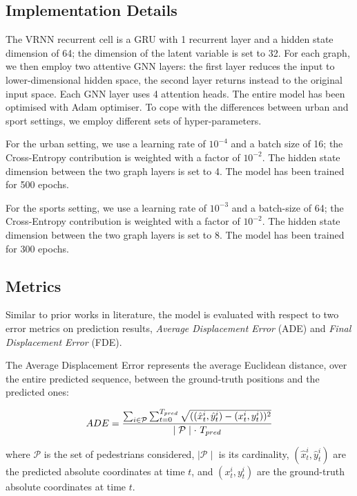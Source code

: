 \documentclass[10pt,a4paper,conference]{IEEEtran}
\begin{document}
\subsection{Implementation Details}
The VRNN recurrent cell is a GRU with 1 recurrent layer and a hidden state dimension of 64; the dimension of the latent variable is set to 32. For each graph, we then employ two attentive GNN layers: the first layer reduces the input to lower-dimensional hidden space, the second layer returns instead to the original input space. Each GNN layer uses 4 attention heads. The entire model has been optimised with Adam optimiser. To cope with the differences between urban and sport settings, we employ different sets of hyper-parameters.

For the urban setting, we use a learning rate of $10^{-4}$ and a batch size of 16; the Cross-Entropy contribution is weighted with a factor of $10^{-2}$. The hidden state dimension between the two graph layers is set to 4. The model has been trained for 500 epochs.

For the sports setting, we use a learning rate of $10^{-3}$ and a batch-size of 64; the Cross-Entropy contribution is weighted with a factor of $10^{-2}$. The hidden state dimension between the two graph layers is set to 8. The model has been trained for 300 epochs.


\subsection{Metrics}
Similar to prior works in literature, the model is evaluated with respect to two error metrics on prediction results, \textit{Average Displacement Error} (ADE) and \textit{Final Displacement Error} (FDE).

The Average Displacement Error represents the average Euclidean distance, over the entire predicted sequence, between the ground-truth positions and the predicted ones:

\begin{equation}
    \label{eq:ade}
    ADE = \frac{
                \sum_{i \in \mathcal{P}} 
                \sum_{t=0}^{T_{pred}} 
                \sqrt{((\hat{x}_{t}^{i}, \hat{y}_{t}^{i}) - (x_{t}^{i}, y_{t}^{i}))^{2}}
            } 
            {
                \mid \mathcal{P} \mid \cdot \thinspace \thinspace T_{pred}
            }
\end{equation}

where $\mathcal{P}$ is the set of pedestrians considered, $\mid \mathcal{P} \mid$ is its cardinality, $(\hat{x}_{t}^{i}, \hat{y}_{t}^{i})$ are the predicted absolute coordinates at time $t$, and $(x_{t}^{i}, y_{t}^{i})$ are the ground-truth absolute coordinates at time $t$.
\end{document}
